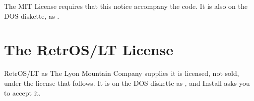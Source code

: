 The MIT License requires that this notice accompany the code. It is also
on the DOS diskette, as .


\section{The RetrOS/LT License}

RetrOS/LT as The Lyon Mountain Company supplies it is licensed, not sold,
under the license that follows. It is on the DOS diskette as
, and Install asks you to accept it.

